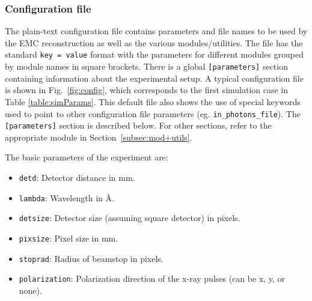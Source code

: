 \documentclass[]{iucr}              %
\begin{document}
\subsubsection{Configuration file}\label{subsubsec:config}

The plain-text configuration file contains parameters and file names to be used by the EMC reconstruction as well as the various modules/utilities. The file has the standard \texttt{key = value} format with the parameters for different modules grouped by module names in square brackets. There is a global \texttt{[parameters]} section containing information about the experimental setup. A typical configuration file is shown in Fig.~\ref{fig:config}, which corresponds to the first simulation case in Table \ref{table:simParams}. This default file also shows the use of special keywords used to point to other configuration file parameters (eg. \texttt{in\_photons\_file}). The \texttt{[parameters]} section is described below. For other sections, refer to the appropriate module in Section~\ref{subsec:mod+utils}.

The basic parameters of the experiment are:
\begin{itemize}
\item \texttt{detd}: Detector distance in mm.
\item \texttt{lambda}: Wavelength in \AA.
\item \texttt{detsize}: Detector size (assuming square detector) in pixels.
\item \texttt{pixsize}: Pixel size in mm.
\item \texttt{stoprad}: Radius of beamstop in pixels.
\item \texttt{polarization}: Polarization direction of the x-ray pulses (can be x, y, or none).
\end{itemize}
\end{document}
